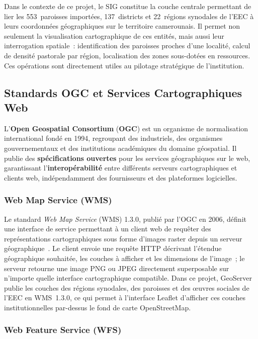\documentclass[12pt, a4paper]{report}
\newcommand{\kw}[1]{\textbf{#1}}
\begin{document}
Dans le contexte de ce projet, le SIG constitue la couche centrale permettant de
lier les 553~paroisses importées, 137~districts et 22~régions synodales de l'EEC
à leurs coordonnées géographiques sur le territoire camerounais. Il permet non seulement
la visualisation cartographique de ces entités, mais aussi leur interrogation
spatiale~: identification des paroisses proches d'une localité, calcul de densité
pastorale par région, localisation des zones sous-dotées en ressources. Ces
opérations sont directement utiles au pilotage stratégique de l'institution.

\subsection{Standards OGC et Services Cartographiques Web}

L'\kw{Open Geospatial Consortium} (\kw{OGC}) est un organisme de normalisation
international fondé en 1994, regroupant des industriels, des organismes
gouvernementaux et des institutions académiques du domaine géospatial. Il
publie des \textbf{spécifications ouvertes} pour les services géographiques sur
le web, garantissant l'\textbf{interopérabilité} entre différents serveurs
cartographiques et clients web, indépendamment des fournisseurs et des
plateformes logicielles.

\subsubsection{Web Map Service (WMS)}

Le standard \textit{Web Map Service} (WMS) 1.3.0, publié par l'OGC en 2006,
définit une interface de service permettant à un client web de requêter des
représentations cartographiques sous forme d'images raster depuis un serveur
géographique~\cite{ogcwms2006}. Le client envoie une requête HTTP décrivant
l'étendue géographique souhaitée, les couches à afficher et les dimensions de
l'image~; le serveur retourne une image PNG ou JPEG directement superposable sur
n'importe quelle interface cartographique compatible. Dans ce projet, GeoServer
publie les couches des régions synodales, des paroisses et des œuvres sociales de
l'EEC en WMS~1.3.0, ce qui permet à l'interface Leaflet d'afficher ces couches
institutionnelles par-dessus le fond de carte OpenStreetMap.

\subsubsection{Web Feature Service (WFS)}
\end{document}

